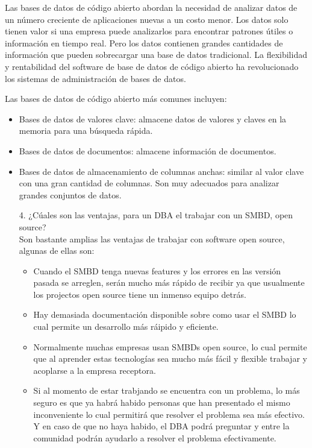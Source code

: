 \documentclass{article}
\begin{document}
Las bases de datos de código abierto abordan la necesidad de analizar datos de un número creciente de aplicaciones nuevas a un costo menor.  Los datos solo tienen valor si una empresa puede analizarlos para encontrar patrones útiles o información en tiempo real. Pero los datos contienen grandes cantidades de información que pueden sobrecargar una base de datos tradicional. La flexibilidad y rentabilidad del software de base de datos de código abierto ha revolucionado los sistemas de administración de bases de datos. 

Las bases de datos de código abierto más comunes incluyen: 
\begin{itemize}
    \item Bases de datos de valores clave: almacene datos de valores y claves en la memoria para una búsqueda rápida. 
    \item Bases de datos de documentos: almacene información de documentos. 
    \item Bases de datos de almacenamiento de columnas anchas: similar al valor clave con una gran cantidad de columnas. Son muy adecuados para analizar grandes conjuntos de datos.
\end{itemize}
    
\begin{itemize}
    \item[4.]¿C\'uales son las ventajas, para un DBA el trabajar con un SMBD, open source?\\
    Son bastante amplias las ventajas de trabajar con software open source, algunas de ellas son:
    
    \begin{itemize}
        \item Cuando el SMBD tenga nuevas features y los errores en las versión pasada se arreglen, serán mucho más rápido de recibir ya que usualmente los projectos open source tiene un inmenso equipo detrás.
        
        \item Hay demasiada documentación disponible sobre como usar el SMBD lo cual permite un desarrollo más ráipido y eficiente.
        
        \item Normalmente muchas empresas usan SMBDs open source, lo cual permite que al aprender estas tecnologías sea mucho más fácil y flexible trabajar y acoplarse a la empresa receptora.
        
        \item Si al momento de estar trabjando se encuentra con un problema, lo más seguro es que ya habrá habido personas que han presentado el mismo inconveniente lo cual permitirá que resolver el problema sea más efectivo. Y en caso de que no haya habido, el DBA podrá preguntar y entre la comunidad podrán ayudarlo a resolver el problema efectivamente. 
    \end{itemize}
\end{itemize}
     
\end{document}

